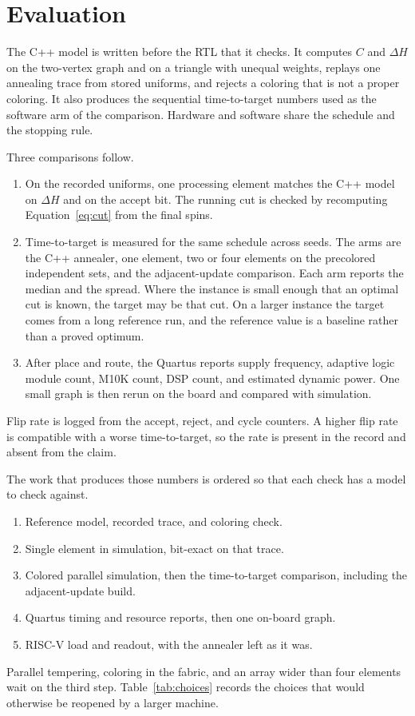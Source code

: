 \documentclass[10pt,twocolumn]{article}
\begin{document}
\section{Evaluation}
\label{sec:eval}

The C++ model is written before the RTL that it checks.
It computes \(C\) and \(\Delta H\) on the two-vertex graph and on a triangle with unequal weights, replays one annealing trace from stored uniforms, and rejects a coloring that is not a proper coloring.
It also produces the sequential time-to-target numbers used as the software arm of the comparison.
Hardware and software share the schedule and the stopping rule.

Three comparisons follow.
\begin{enumerate}
\item On the recorded uniforms, one processing element matches the C++ model on \(\Delta H\) and on the accept bit.
  The running cut is checked by recomputing Equation~\eqref{eq:cut} from the final spins.
\item Time-to-target is measured for the same schedule across seeds.
  The arms are the C++ annealer, one element, two or four elements on the precolored independent sets, and the adjacent-update comparison.
  Each arm reports the median and the spread.
  Where the instance is small enough that an optimal cut is known, the target may be that cut.
  On a larger instance the target comes from a long reference run, and the reference value is a baseline rather than a proved optimum.
\item After place and route, the Quartus reports supply frequency, adaptive logic module count, M10K count, DSP count, and estimated dynamic power.
  One small graph is then rerun on the board and compared with simulation.
\end{enumerate}
Flip rate is logged from the accept, reject, and cycle counters.
A higher flip rate is compatible with a worse time-to-target, so the rate is present in the record and absent from the claim.

The work that produces those numbers is ordered so that each check has a model to check against.
\begin{enumerate}
\item Reference model, recorded trace, and coloring check.
\item Single element in simulation, bit-exact on that trace.
\item Colored parallel simulation, then the time-to-target comparison, including the adjacent-update build.
\item Quartus timing and resource reports, then one on-board graph.
\item RISC-V load and readout, with the annealer left as it was.
\end{enumerate}
Parallel tempering, coloring in the fabric, and an array wider than four elements wait on the third step.
Table~\ref{tab:choices} records the choices that would otherwise be reopened by a larger machine.
\end{document}
